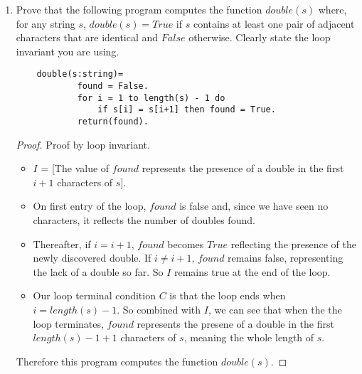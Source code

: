 \documentclass[10pt]{article}
\begin{document}
\begin{enumerate}
\pagebreak
\addtocounter{enumi}{2}
\item
Prove that the following program computes the function $double(s)$ where, for any string $s$, $double(s) = True$ if $s$ contains at least one pair of adjacent characters that are identical and $False$ otherwise.  Clearly state the loop invariant you are using.
\begin{verbatim}
    double(s:string)=
            found = False.
            for i = 1 to length(s) - 1 do
                if s[i] = s[i+1] then found = True.
            return(found).
\end{verbatim}
\begin{proof}
Proof by loop invariant.\\
\begin{itemize}
\item
$I$ = [The value of $found$ represents the presence of a double in the first $i + 1$ characters of $s$].
\item
On first entry of the loop, $found$ is false and, since we have seen no characters, it reflects the number of doubles found.
\item
Thereafter, if $i = i+1$, $found$ becomes $True$ reflecting the presence of the newly discovered double.  If $i \neq i+1$, $found$ remains false, representing the lack of a double so far.  So $I$ remains true at the end of the loop.
\item
Our loop terminal condition $C$ is that the loop ends when $i = length(s) - 1$.  So combined with $I$, we can see that when the the loop terminates, $found$ represents the presene of a double in the first $length(s) - 1 + 1$ characters of $s$, meaning the whole length of $s$.
\end{itemize}
Therefore this program computes the function $double(s)$.
\end{proof}
\end{enumerate}
\end{document}
